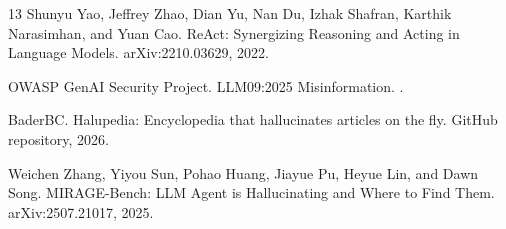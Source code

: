 \documentclass[11pt]{article}
\begin{document}
\begin{thebibliography}{13}
Shunyu Yao, Jeffrey Zhao, Dian Yu, Nan Du, Izhak Shafran, Karthik Narasimhan, and Yuan Cao.
\newblock ReAct: Synergizing Reasoning and Acting in Language Models.
\newblock arXiv:2210.03629, 2022.

OWASP GenAI Security Project.
\newblock LLM09:2025 Misinformation.
.

BaderBC.
\newblock Halupedia: Encyclopedia that hallucinates articles on the fly.
\newblock GitHub repository, 2026.

Weichen Zhang, Yiyou Sun, Pohao Huang, Jiayue Pu, Heyue Lin, and Dawn Song.
\newblock MIRAGE-Bench: LLM Agent is Hallucinating and Where to Find Them.
\newblock arXiv:2507.21017, 2025.

\end{thebibliography}
\end{document}
